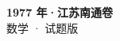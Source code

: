 \documentclass[zihao=-4, a4paper]{ctexart}
\begin{document}
\begin{center}
  {\Large\bfseries 1977 年·江苏南通卷}\\[4pt]
  {\large 数学 · 试题版}
\end{center}
\medskip
{}

\end{document}

